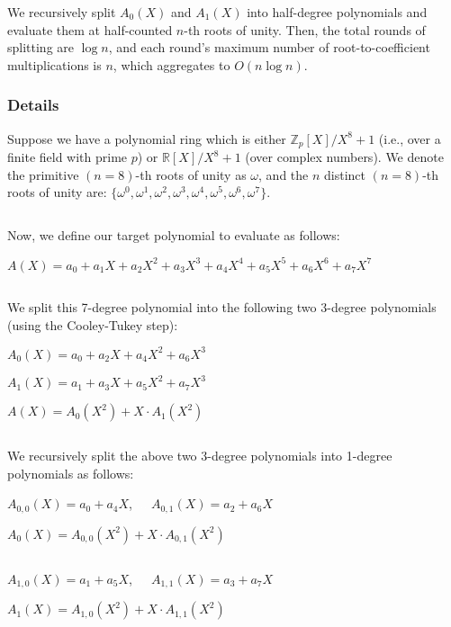 We recursively split $A_0(X)$ and $A_1(X)$ into half-degree polynomials and evaluate them at half-counted $n$-th roots of unity. Then, the total rounds of splitting are $\log n$, and each round's maximum number of root-to-coefficient multiplications is $n$, which aggregates to $O(n \log n)$. 

\subsubsection{Details}
\label{subsec:ntt-forward-details}

Suppose we have a polynomial ring which is either $\mathbb{Z}_{p}[X] / X^8 + 1$ (i.e., over a finite field with prime $p$) or $\mathbb{R}[X] / X^8 + 1$ (over complex numbers). 
We denote the primitive $(n=8)$-th roots of unity as $\omega$, and 
the $n$ distinct $(n=8)$-th roots of unity are: $\{\omega^0, \omega^1, \omega^2, \omega^3, \omega^4, \omega^5, \omega^6, \omega^7\}$.

$ $

Now, we define our target polynomial to evaluate as follows: 

$A(X) = a_0 + a_1X + a_2X^2 + a_3X^3 + a_4X^4 + a_5X^5 + a_6X^6 + a_7X^7$

$ $

We split this 7-degree polynomial into the following two 3-degree polynomials (using the Cooley-Tukey step): 

$A_0(X) = a_0 + a_2X + a_4X^2 + a_6X^3$

$A_1(X) = a_1 + a_3X + a_5X^2 + a_7X^3$

$A(X) = A_0(X^2) + X \cdot A_1(X^2)$

$ $

We recursively split the above two 3-degree polynomials into 1-degree polynomials as follows:


$A_{0,0}(X) = a_0 + a_4X$, \textcolor{white}{...} $A_{0,1}(X) = a_2 + a_6X$

$A_0(X) = A_{0,0}(X^2) + X\cdot A_{0,1}(X^2)$

$ $

$A_{1,0}(X) = a_1 + a_5X$, \textcolor{white}{...} $A_{1,1}(X) = a_3 + a_7X$

$A_1(X) = A_{1,0}(X^2) + X\cdot A_{1,1}(X^2)$

$ $


